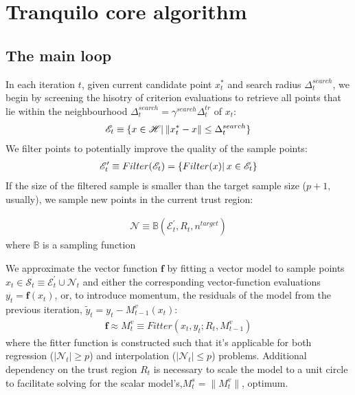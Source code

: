 \section{Tranquilo core algorithm}


\subsection{The main loop}
In each iteration $t$, given current candidate point $x^*_t$ and search radius $\Delta^{search}_t$, we begin by screening the hisotry of criterion evaluations to retrieve all points that lie within the neighbourhood $\Delta^{search}_t=\gamma^{search}\Delta_t^{tr}$ of $x_t$:
\begin{align}
    \mathscr{E}_t\equiv\{x\in\mathscr{H}|\hspace{0.2em}\lVert x^*_t-x\rVert\leq\Delta^{search}_t\}
    \label{eq:hist-search}
\end{align}
We filter points to potentially improve the quality of the sample points:
\begin{align}
    \mathscr{E}'_t\equiv Filter (\mathscr{E}_t) = \{ Filter (x)|\hspace{0.2em} x\in \mathscr{E}_t\}
    \label{eq:filtering}
\end{align}
If the size of the filtered sample is smaller than the target sample size ($p+1$, usually), we sample new points in the current trust region:

\begin{align}
    \mathcal{N}\equiv\mathbb{B}(\mathcal{E}_t^{'},R_t,n^{target})
\end{align}
where $\mathbb{B}$ is a sampling function

We approximate the vector function $\mathbf{f}$ by fitting a vector model to sample points $x_t\in\mathcal{S}_t\equiv\mathcal{E}^{'}_t\cup\mathcal{N}_t$ and either the corresponding vector-function evaluations $y_t=\mathbf{f}(x_t)$, or, to introduce momentum, the residuals of the model from the previous iteration, $\tilde{y}_t =y_t-M_{t-1}^v(x_t)$:
\begin{align}
    \mathbf{f}\approx M_t^v\equiv Fitter(x_t,y_t;R_t,M_{t-1}^v)
\end{align}
where the fitter function is constructed such that it's applicable for both regression ($|\mathcal{N}_t|\geq p$) and interpolation ($|\mathcal{N}_t|\leq p$) problems. Additional dependency on the trust region $R_t$ is necessary to scale the model to a unit circle to facilitate solving for the scalar model's,$M_t^s = \lVert M_t^v\rVert$, optimum.

